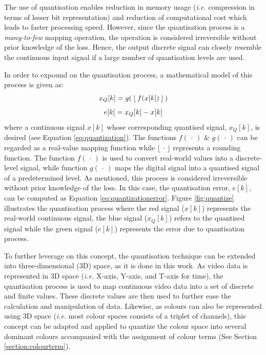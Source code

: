 The use of quantisation enables reduction in memory usage (\emph{i.e.} compression in terms of lesser bit representation) and
reduction of computational cost which leads to faster processing speed.
However, since the quantisation process is a \emph{many-to-few} mapping
operation, the operation is considered irreversible without prior knowledge of
the loss. Hence, the output discrete signal can closely resemble the continuous input signal if a large number of quantisation levels are used.

In order to expound on the quantisation process, a mathematical model of this
process is given as:
\begin{equation}
 \centering
 \label{eq:quantization}
 x_Q[k] = g(\mspace{3mu}\lfloor \mspace{3mu}f(x[k]) \mspace{3mu}\rfloor\mspace{3mu})
\end{equation}
\vspace{-3em}
\begin{equation}
 \centering
 \label{eq:quantizationerror}
 e[k] = x_Q[k] - x[k]
\end{equation}
where a continuous signal $x[k]$ whose
corresponding quantised signal, $x_Q[k]$, is desired (see Equation \ref{eq:quantization}). The
functions $f (\mspace{3mu} \cdot \mspace{3mu})$ \& $g (\mspace{3mu} \cdot\mspace{3mu})$
can be regarded as a real-value mapping function while $\lfloor \mspace{3mu} \cdot
\mspace{3mu} \rfloor$ represents a rounding function. The function $
f(\mspace{3mu} \cdot \mspace{3mu})$ is used to
convert real-world values into a discrete-level signal, while function
$g (\mspace{3mu} \cdot\mspace{3mu})$ maps the digital signal into a
quantised signal of a predetermined level. As mentioned, this process is considered irreversible without
prior knowledge of the loss. In this case, the quantisation error, $e[k]$, can be
computed as Equation \ref{eq:quantizationerror}. Figure \ref{fig:quantize}
illustrates the quantisation process where the red signal ($x[k]$) represents
the real-world continuous signal, the blue signal ($x_Q[k]$) refers to the
quantised signal while the green signal ($e[k]$) represents the error due to
quantisation process.

To further leverage on this concept, the quantisation technique
can be extended into three-dimensional (3D) space, as it is done in this work. As video data is represented in 3D space (\emph{i.e.} X-axis, Y-axis, and T-axis for time), the quantisation process is used to map continuous video data into a set of discrete
and finite values. These discrete values are then used to further ease the
calculation and manipulation of data. Likewise, as colours can also be
represented using 3D space (\emph{i.e.} most colour spaces consists of a triplet of channels), this concept can be adapted and applied to quantize the colour space into several dominant colours accompanied
with the assignment of colour terms (See Section \ref{section:colourterm}).



